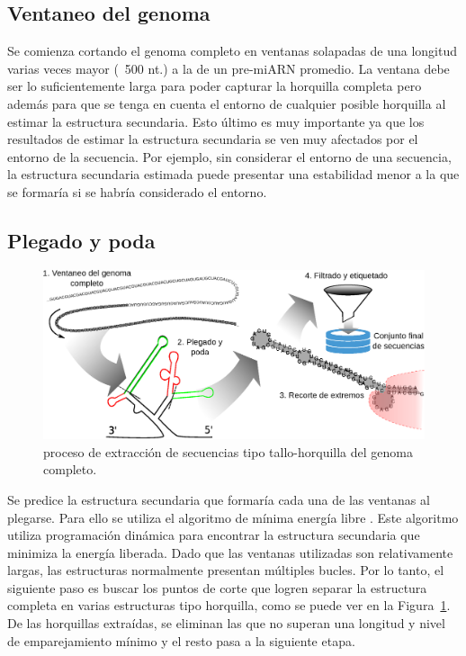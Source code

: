 \subsection{Ventaneo del genoma}

Se comienza cortando el genoma completo en ventanas solapadas de una longitud varias veces mayor (~500 nt.) a la de un pre-miARN promedio. La ventana debe ser
lo suficientemente larga para poder capturar la horquilla completa pero además para que se tenga en cuenta el entorno de cualquier posible horquilla al
estimar la estructura secundaria. Esto último es muy importante ya que los resultados de estimar la estructura secundaria se ven muy afectados por el entorno
de la secuencia. Por ejemplo, sin considerar el entorno de una secuencia, la estructura secundaria estimada puede presentar una estabilidad menor a la que se
formaría si se habría considerado el entorno.

\subsection{Plegado y poda}

\begin{figure}[t]
	\centering
	\includegraphics[width=\textwidth]{fig/hextractor.eps}
	\caption[Extracción de secuencias tipo tallo-horquilla]{proceso de extracción de secuencias tipo tallo-horquilla del genoma completo.}
	\label{fig:hextractor}
\end{figure}

Se predice la estructura secundaria que formaría cada una de las ventanas al plegarse. Para ello se utiliza el algoritmo de mínima energía libre
\citep{zuker1981optimal}. Este algoritmo utiliza programación dinámica para encontrar la estructura secundaria que minimiza la energía liberada. Dado que
las ventanas utilizadas son relativamente largas, las estructuras normalmente presentan múltiples bucles. Por lo tanto, el siguiente paso es buscar los puntos
de corte que logren separar la estructura completa en varias estructuras tipo horquilla, como se puede ver en la Figura~\ref{fig:hextractor}. De las horquillas
extraídas, se eliminan las que no superan una longitud y nivel de emparejamiento mínimo y el resto pasa a la siguiente etapa.

